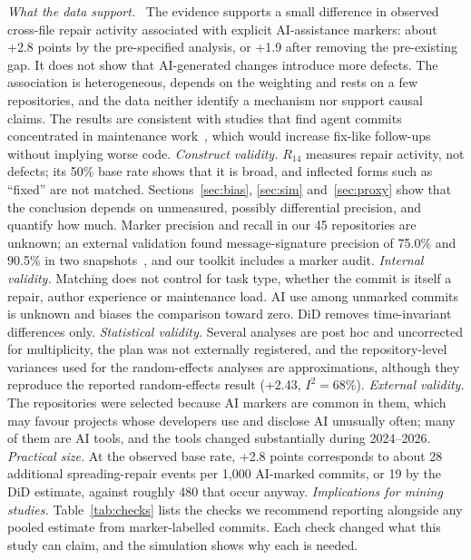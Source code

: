 \documentclass[runningheads]{llncs}
\newcommand{\runin}[1]{\par\textit{#1}\ }
\begin{document}
\runin{What the data support.} The evidence supports a small difference in observed cross-file repair activity associated with explicit AI-assistance markers: about +2.8 points by the pre-specified analysis, or +1.9 after removing the pre-existing gap. It does not show that AI-generated changes introduce more defects. The association is heterogeneous, depends on the weighting and rests on a few repositories, and the data neither identify a mechanism nor support causal claims. The results are consistent with studies that find agent commits concentrated in maintenance work~\cite{khosravani2026,ferdous2026}, which would increase fix-like follow-ups without implying worse code. \textit{Construct validity.} $R_{14}$ measures repair activity, not defects; its 50\% base rate shows that it is broad, and inflected forms such as ``fixed'' are not matched. Sections~\ref{sec:bias}, \ref{sec:sim} and~\ref{sec:proxy} show that the conclusion depends on unmeasured, possibly differential precision, and quantify how much. Marker precision and recall in our 45 repositories are unknown; an external validation found message-signature precision of 75.0\% and 90.5\% in two snapshots~\cite{khosravani2026}, and our toolkit includes a marker audit. \textit{Internal validity.} Matching does not control for task type, whether the commit is itself a repair, author experience or maintenance load. AI use among unmarked commits is unknown and biases the comparison toward zero. DiD removes time-invariant differences only. \textit{Statistical validity.} Several analyses are post hoc and uncorrected for multiplicity, the plan was not externally registered, and the repository-level variances used for the random-effects analyses are approximations, although they reproduce the reported random-effects result (+2.43, $I^2 = 68\%$). \textit{External validity.} The repositories were selected because AI markers are common in them, which may favour projects whose developers use and disclose AI unusually often; many of them are AI tools, and the tools changed substantially during 2024--2026. \textit{Practical size.} At the observed base rate, +2.8 points corresponds to about 28 additional spreading-repair events per 1,000 AI-marked commits, or 19 by the DiD estimate, against roughly 480 that occur anyway. \textit{Implications for mining studies.} Table~\ref{tab:checks} lists the checks we recommend reporting alongside any pooled estimate from marker-labelled commits. Each check changed what this study can claim, and the simulation shows why each is needed.
\end{document}

